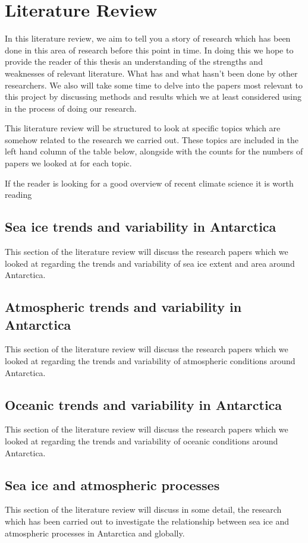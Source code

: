 \documentclass[../main.tex]{subfiles}
\begin{document}
\chapter{Literature Review}
In this literature review, we aim to tell you a story of research which has been done in this area of research before this point in time. In doing this we hope to provide the reader of this thesis an understanding of the strengths and weaknesses of relevant literature. What has and what hasn't been done by other researchers. We also will take some time to delve into the papers most relevant to this project by discussing methods and results which we at least considered using in the process of doing our research.\medskip

This literature review will be structured to look at specific topics which are somehow related to the research we carried out. These topics are included in the left hand column of the table below, alongside with the counts for the numbers of papers we looked at for each topic.

If the reader is looking for a good overview of recent climate science it is worth reading \cite{clem}


\section{Sea ice trends and variability in Antarctica}
This section of the literature review will discuss the research papers which we looked at regarding the trends and variability of sea ice extent and area around Antarctica.


\section{Atmospheric trends and variability in Antarctica}
This section of the literature review will discuss the research papers which we looked at regarding the trends and variability of atmospheric conditions around Antarctica.


\section{Oceanic trends and variability in Antarctica}
This section of the literature review will discuss the research papers which we looked at regarding the trends and variability of oceanic conditions around Antarctica.

\section{Sea ice and atmospheric processes}
This section of the literature review will discuss in some detail, the research which has been carried out to investigate the relationship between sea ice and atmospheric processes in Antarctica and globally.
\end{document}
